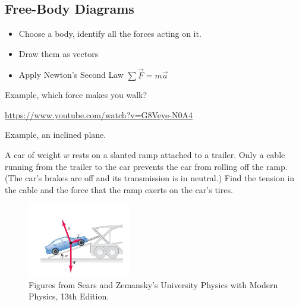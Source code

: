 \documentclass[]{beamer}
\begin{document}

 \subsection{Free-Body Diagrams}

    \begin{frame}
      \begin{itemize}
        \item Choose a body, identify all the forces acting on it. 
        \item Draw them as vectors
        \item Apply Newton's Second Law $\sum \vec{F}=m\vec{a}$
      \end{itemize}
      \end{frame}




    \begin{frame}
 Example, which force makes you walk? 
 \vspace{3mm}

 \url{https://www.youtube.com/watch?v=G8Veye-N0A4}

      \end{frame}







    \begin{frame}
Example, an inclined plane.
\vspace{3mm}


A car of weight $w$ rests on a slanted ramp attached to a trailer.
 Only a cable running from the trailer to the car prevents
the car from rolling off the ramp. (The car’s brakes are off
and its transmission is in neutral.) Find the tension in the cable
and the force that the ramp exerts on the car’s tires.


\begin{figure}[h!]  
  \includegraphics[width=0.4\textwidth]{images/f16.jpg}
  \caption{ {\tiny Figures from Sears and Zemansky's University Physics 
  with Modern Physics, 13th Edition.} }
\end{figure}



      \end{frame}
\end{document}
